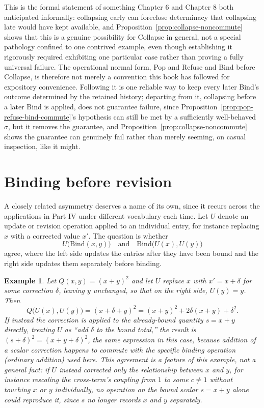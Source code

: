 \documentclass[11pt]{book}
\newtheorem{example}[theorem]{Example}
\begin{document}
This is the formal statement of something Chapter 6 and Chapter 8 both anticipated informally: collapsing early can foreclose determinacy that collapsing late would have kept available, and Proposition~\ref{prop:collapse-noncommute} shows that this is a genuine possibility for Collapse in general, not a special pathology confined to one contrived example, even though establishing it rigorously required exhibiting one particular case rather than proving a fully universal failure. The operational normal form, Pop and Refuse and Bind before Collapse, is therefore not merely a convention this book has followed for expository convenience. Following it is one reliable way to keep every later Bind's outcome determined by the retained history; departing from it, collapsing before a later Bind is applied, does not guarantee failure, since Proposition~\ref{prop:pop-refuse-bind-commute}'s hypothesis can still be met by a sufficiently well-behaved $\sigma$, but it removes the guarantee, and Proposition~\ref{prop:collapse-noncommute} shows the guarantee can genuinely fail rather than merely seeming, on casual inspection, like it might.

\section{Binding before revision}

A closely related asymmetry deserves a name of its own, since it recurs across the applications in Part IV under different vocabulary each time. Let $U$ denote an update or revision operation applied to an individual entry, for instance replacing $x$ with a corrected value $x'$. The question is whether
\[
U\bigl(\mathrm{Bind}(x,y)\bigr) \quad\text{and}\quad \mathrm{Bind}\bigl(U(x),U(y)\bigr)
\]
agree, where the left side updates the entries after they have been bound and the right side updates them separately before binding.

\begin{example}
Let $Q(x,y)=(x+y)^2$ and let $U$ replace $x$ with $x'=x+\delta$ for some correction $\delta$, leaving $y$ unchanged, so that on the right side, $U(y)=y$. Then
\[
Q\bigl(U(x),U(y)\bigr) = (x+\delta+y)^2 = (x+y)^2 + 2\delta(x+y) + \delta^2.
\]
If instead the correction is applied to the already-bound quantity $s=x+y$ directly, treating $U$ as ``add $\delta$ to the bound total,'' the result is $(s+\delta)^2=(x+y+\delta)^2$, the same expression in this case, because addition of a scalar correction happens to commute with the specific binding operation (ordinary addition) used here. This agreement is a feature of this example, not a general fact: if $U$ instead corrected only the \emph{relationship} between $x$ and $y$, for instance rescaling the cross-term's coupling from $1$ to some $c\ne1$ without touching $x$ or $y$ individually, no operation on the bound scalar $s=x+y$ alone could reproduce it, since $s$ no longer records $x$ and $y$ separately.
\end{example}
\end{document}
